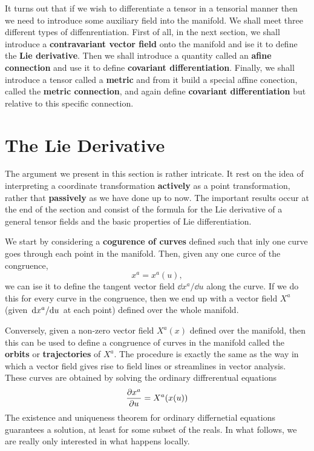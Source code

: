 It turns out that if  we wish to differentiate a tensor in a tensorial manner then we need to introduce some auxiliary field into the manifold. We shall meet three different types of diffenrentiation. First of all, in the next section, we shall introduce a \textbf{contravariant vector field} onto the manifold and ise it to define the \textbf{Lie derivative}. Then we shall introduce a quantity called an \textbf{afine connection} and use it to define \textbf{covariant differentiation}. Finally, we shall introduce a tensor called a \textbf{metric} and from it build a special affine conection, called the \textbf{metric connection}, and again define \textbf{covariant differentiation} but relative to this specific connection.

\section{The Lie Derivative}\label{sec:6.2}
The argument we present in this section is rather intricate. It rest on the idea of interpreting a coordinate transformation \textbf{actively} as a point transformation, rather that \textbf{passively} as we have done up to now.  The important results occur at the end of the section and consist of the formula for the Lie derivative of a general tensor fields and the basic properties of Lie differentiation.

We start by considering a \textbf{cogurence of curves}  defined such that inly one curve goes through each point in the manifold. Then, given any one curce of the congruence, $$x^{a}=x^{a}(u),$$ we can ise it to define the tangent vector field $\dd x^{a}/\dd u$ along the curve. If we do this for every curve in the congruence, then we end up with a vector field $X^{a}$ (given $\dv*{x^{a}}{u}$ at each point) defined over the whole manifold. 

Conversely, given a non-zero vector field $X^{a}(x)$ defined over the manifold, then this can be used to define a congruence of curves in the manifold called the \textbf{orbits} or \textbf{trajectories} of $X^{a}$. The procedure is exactly the same as the way in which a vector field gives rise to field lines or streamlines in vector analysis. These curves are obtained by solving the ordinary diffrerentual equations
\begin{equation}\label{6.2}
	\pdv{x^{a}}{u}=X^{a}(x(u))
\end{equation}
The existence and uniqueness theorem for ordinary differnetial equations guarantees a solution, at least for some subset of the reals. In what follows, we are really only interested in what happens locally.

